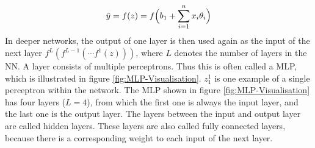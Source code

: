 \begin{equation}
    \centering
    \hat{y} = f(z) = f\Big(b_1 + \sum_{i=1}^n x_i \theta_i \Big)
    \label{eq:Perceptron-Calculate-Output}
\end{equation}
In deeper networks, the output of one layer is then used again as the input of the next layer $f^L(f^{L-1}(\cdots f^1(z)))$, where $L$ denotes the number of layers in the \gls{NN}. A layer consists of multiple perceptrons. Thus this is often called a \gls{MLP}, which is illustrated in figure \ref{fig:MLP-Visualisation}. $z_1^1$ is one example of a single perceptron within the network. The \gls{MLP} shown in figure \ref{fig:MLP-Visualisation} has four layers ($L = 4$), from which the first one is always the input layer, and the last one is the output layer. The layers between the input and output layer are called hidden layers. These layers are also called fully connected layers, because there is a corresponding weight to each input of the next layer.

